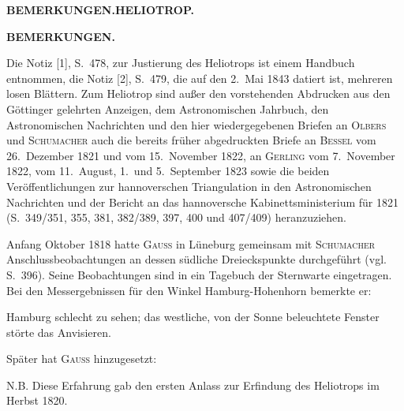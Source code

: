 \clearpage
\noindent\null\hfill{\small\textbf{BEMERKUNGEN.\quad HELIOTROP.}}\hfill{}\par
\vspace*{28mm}
\begin{center}\textbf{BEMERKUNGEN.}\end{center}
\begingroup\small
Die Notiz [1], S.~478, zur Justierung des Heliotrops ist einem Handbuch entnommen, die Notiz [2], S.~479,
die auf den 2.~Mai 1843 datiert ist, mehreren losen Blättern. Zum Heliotrop sind außer den vorstehenden Abdrucken aus den
Göttinger gelehrten Anzeigen, dem Astronomischen Jahrbuch, den Astronomischen Nachrichten und den
hier wiedergegebenen Briefen an \textsc{Olbers} und \textsc{Schumacher} auch die bereits früher abgedruckten Briefe an
\textsc{Bessel} vom 26.~Dezember 1821 und vom 15.~November 1822, an \textsc{Gerling} vom 7.~November 1822,
vom 11.~August, 1.~und 5.~September 1823 sowie die beiden Veröffentlichungen zur hannoverschen Triangulation
in den Astronomischen Nachrichten und der Bericht an das hannoversche Kabinettsministerium für 1821
(S.~349/351, 355, 381, 382/389, 397, 400 und 407/409) heranzuziehen.

Anfang Oktober 1818 hatte \textsc{Gauss} in Lüneburg gemeinsam mit \textsc{Schumacher} Anschlussbeobachtungen
an dessen südliche Dreieckspunkte durchgeführt (vgl. S.~396). Seine Beobachtungen sind in ein Tagebuch
der Sternwarte eingetragen. Bei den Messergebnissen für den Winkel Hamburg-Hohenhorn bemerkte er:

\glqq Hamburg schlecht zu sehen; das westliche, von der Sonne beleuchtete Fenster störte das Anvisieren.\grqq

Später hat \textsc{Gauss} hinzugesetzt:

\glqq N.B. Diese Erfahrung gab den ersten Anlass zur Erfindung des Heliotrops im Herbst 1820.\grqq

